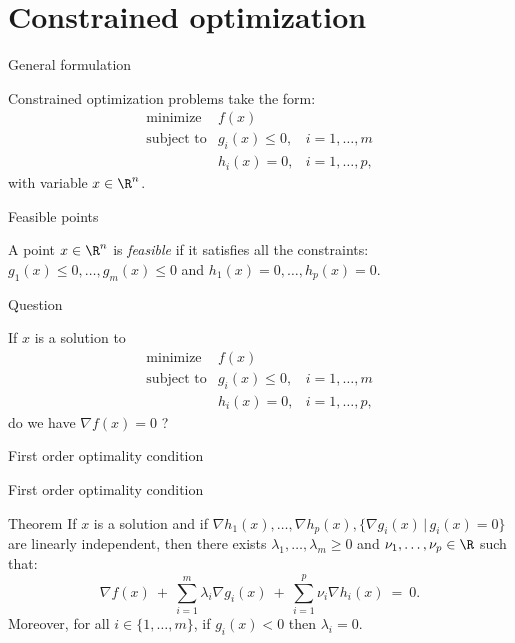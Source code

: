 \documentclass{beamer}
\begin{document}
\section{Constrained optimization}

\begin{frame}[t]{General formulation}
	\grid

	Constrained optimization problems take the form:
	$$
	\begin{array}{lll}
		\text{minimize} & f(x) & \\
		\text{subject to} & g_i(x) \leq 0, & i=1, \dots, m \\
						  & h_i(x) = 0, & i=1, \dots, p,
	\end{array}
	$$
	with variable $x \in \R^n$.
\end{frame}

\begin{frame}[t]{Feasible points}
	\grid
	\begin{definition}
		A point $x \in \R^n$ is \emph{feasible} if it satisfies all the constraints: $g_1(x) \leq 0, \dots, g_m(x)\leq  0$ and $h_1(x) = 0, \dots, h_p(x) = 0$. 
	\end{definition}


\end{frame}

\begin{frame}[t]{Question}
	\grid

	If $x$ is a solution to
	$$
	\begin{array}{lll}
		\text{minimize} & f(x) & \\
		\text{subject to} & g_i(x) \leq 0, & i=1, \dots, m \\
						  & h_i(x) = 0, & i=1, \dots, p,
	\end{array}
	$$
	do we have $\nabla f(x) = 0$ ?
\end{frame}


\begin{frame}[t]{First order optimality condition}
	\grid

	\pause
	\pause
	\pause
\end{frame}

\begin{frame}[t]{First order optimality condition}
	\grid

	\vspace{-0.4cm}
	\begin{block}{Theorem}
		If $x$ is a solution and if $\nabla h_1(x), \dots, \nabla h_p(x), \{\nabla g_i(x) \, | \, g_i(x) = 0 \}$ are linearly independent,
		then there exists $\lambda_1, \dots, \lambda_m \geq 0$ and $\nu_1, \dots, \nu_p \in \R$ such that:
		$$
		\nabla f(x) \ + \ \sum_{i=1}^m \lambda_i \nabla g_i(x) \ + \ \sum_{i=1}^p \nu_i \nabla h_i(x)  \ = \ 0.
		$$
		Moreover, for all  $i\in \{1, \dots, m\}$, if $g_i(x) < 0$ then $\lambda_i = 0$.
	\end{block}

\end{frame}
\end{document}
